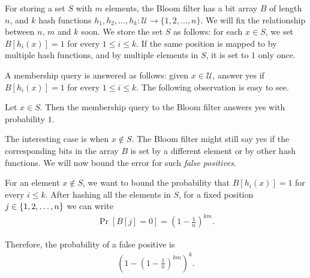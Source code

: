 For storing a set $S$ with $m$ elements, the Bloom filter has a bit array $B$ of
length $n$, and $k$ hash functions
$h_1,h_2,\ldots,h_k: \mathcal{U} \to \{1,2,\ldots,n\}$. We will fix the
relationship between $n$, $m$ and $k$ soon. We store the set $S$ as follows: for
each $x\in S$, we set $B[h_i(x)] = 1$ for every $1\leq i\leq k$. If the same
position is mapped to by multiple hash functions, and by multiple elements in
$S$, it is set to $1$ only once.

A membership query is answered as follows: given $x\in \mathcal{U}$, answer yes
if $B[h_i(x)]=1$ for every $1 \leq i\leq k$. The following observation is easy
to see.

\begin{proposition}
  Let $x\in S$. Then the membership query to the Bloom filter answers yes with probability $1$.
  \label{prop:bf-positives}
\end{proposition}

The interesting case is when $x\notin S$. The Bloom filter might still say yes
if the corresponding bits in the array $B$ is set by a different element or by
other hash functions. We will now bound the error for such \emph{false
  positives}.

For an element $x\notin S$, we want to bound the probability that
$B[h_i(x)] = 1$ for every $i \leq k$. After hashing all the elements in $S$, for a fixed position $j\in \{1,2,\ldots,n\}$ we can write
\begin{align*}
  \Pr[B[j] = 0] = \left(1 - \frac{1}{n} \right)^{km}.
\end{align*}

Therefore, the probability of a false positive is
\begin{align*}
  \left(1 - \left(1 - \frac{1}{n} \right)^{km}  \right)^k.
\end{align*}



